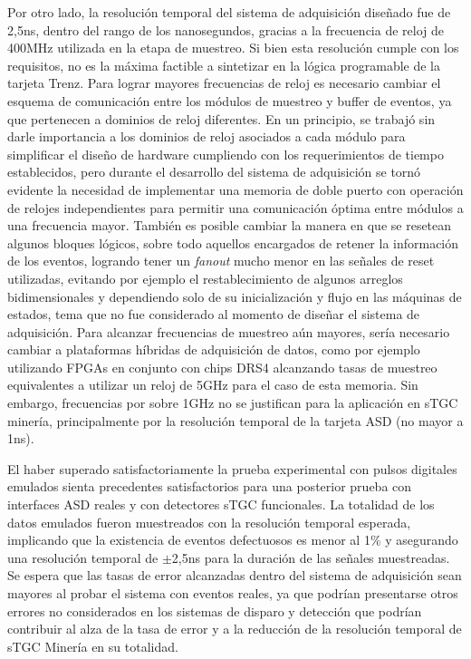 Por otro lado, la resolución temporal del sistema de adquisición diseñado fue de 2,5ns, dentro del rango de los nanosegundos, gracias a la frecuencia de reloj de 400MHz utilizada en la etapa de muestreo. Si bien esta resolución cumple con los requisitos, no es la máxima factible a sintetizar en la lógica programable de la tarjeta Trenz. Para lograr mayores frecuencias de reloj es necesario cambiar el esquema de comunicación entre los módulos de muestreo y buffer de eventos, ya que pertenecen a dominios de reloj diferentes. En un principio, se trabajó sin darle importancia a los dominios de reloj asociados a cada módulo para simplificar el diseño de hardware cumpliendo con los requerimientos de tiempo establecidos, pero durante el desarrollo del sistema de adquisición se tornó evidente la necesidad de implementar una memoria de doble puerto con operación de relojes independientes para permitir una comunicación óptima entre módulos a una frecuencia mayor. También es posible cambiar la manera en que se resetean algunos bloques lógicos, sobre todo aquellos encargados de retener la información de los eventos, logrando tener un \textit{fanout} mucho menor en las señales de reset utilizadas, evitando por ejemplo el restablecimiento de algunos arreglos bidimensionales y dependiendo solo de su inicialización y flujo en las máquinas de estados, tema que no fue considerado al momento de diseñar el sistema de adquisición. Para alcanzar frecuencias de muestreo aún mayores, sería necesario cambiar a plataformas híbridas de adquisición de datos, como por ejemplo utilizando FPGAs en conjunto con chips DRS4\cite{RittDRS4Array} alcanzando tasas de muestreo equivalentes a utilizar un reloj de 5GHz para el caso de esta memoria. Sin embargo, frecuencias por sobre 1GHz no se justifican para la aplicación en sTGC minería, principalmente por la resolución temporal de la tarjeta ASD (no mayor a 1ns).

El haber superado satisfactoriamente la prueba experimental con pulsos digitales emulados sienta precedentes satisfactorios para una posterior prueba con interfaces ASD reales y con detectores sTGC funcionales. La totalidad %
de los datos emulados fueron muestreados con la resolución temporal esperada, implicando que la existencia de eventos defectuosos es menor al 1\% y asegurando una resolución temporal de $\pm$2,5ns para la duración de las señales muestreadas. Se espera que las tasas de error alcanzadas dentro del sistema de adquisición sean mayores al probar el sistema con eventos reales, ya que podrían presentarse otros errores no considerados en los sistemas de disparo y detección que podrían contribuir al alza de la tasa de error y a la reducción de la resolución temporal de sTGC Minería en su totalidad.


